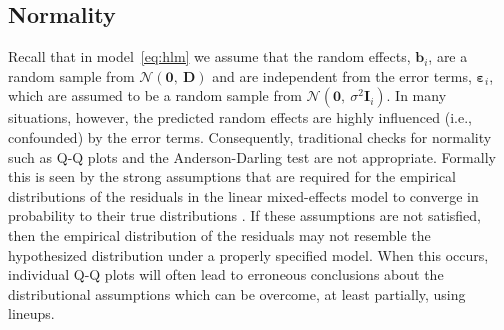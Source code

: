 \documentclass[12pt]{article} %
\newcommand{\hh}[1]{{\color{orange} #1}}
\begin{document}
\subsection{Normality}



Recall that in model~\eqref{eq:hlm} we assume that the random effects, $\bm{b}_i$, are a random sample from $\mathcal{N}(\bm{0},\ \bm{D})$ and are independent from the error terms, $\bm{\varepsilon}_i$, which are assumed to be a random sample from $\mathcal{N}(\bm{0},\ \sigma^2 \bm{I}_i)$. In many situations, however, the predicted random effects are highly influenced (i.e., confounded) by the error terms. Consequently, traditional checks for normality such as Q-Q plots and the Anderson-Darling test are not appropriate. 
Formally this is seen by the
strong assumptions that are required for the empirical distributions of the residuals in the linear mixed-effects model to converge in probability to their true distributions \citep[Theorem 3.2 and Lemma 3.1]{Jiang:1998vt}. If these assumptions are not satisfied, then the empirical distribution of the residuals may not resemble the hypothesized distribution under a properly specified model. When this occurs, individual Q-Q plots will often lead to erroneous conclusions about the distributional assumptions which can be overcome, at least partially, using lineups.
\end{document}
